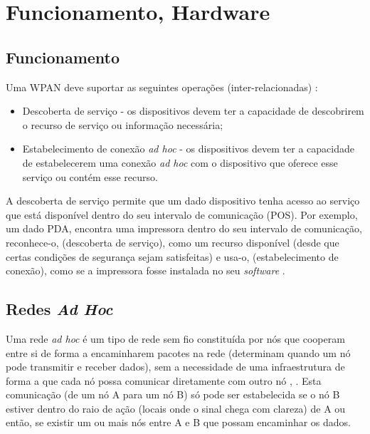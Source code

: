 \documentclass[conference]{IEEEtran}
\begin{document}
\section{Funcionamento, Hardware} \label{func_hard}

\subsection{Funcionamento}

Uma WPAN deve suportar as seguintes operações (inter-relacionadas) \cite{prasad2004ofdm}:

\begin{itemize}

 \item Descoberta de serviço - os dispositivos devem ter a capacidade de descobrirem o recurso de serviço ou informação necessária;
 \item Estabelecimento de conexão \textit{ad hoc} - os dispositivos devem ter a capacidade de estabelecerem uma conexão \textit{ad hoc} com o dispositivo que oferece esse serviço ou contém esse recurso.
 
\end{itemize}

A descoberta de serviço permite que um dado dispositivo tenha acesso ao serviço que está disponível dentro do seu intervalo de comunicação (POS).
Por exemplo, um dado PDA, encontra uma impressora dentro do seu intervalo de comunicação, reconhece-o, (descoberta de serviço), como um recurso disponível (desde que certas condições de segurança sejam satisfeitas) e usa-o, (estabelecimento de conexão), como se a impressora fosse instalada no seu \textit{software} \cite{prasad2004ofdm}.

\subsection{Redes \textit{Ad Hoc}} \label{redes_ad_hoc}

Uma rede \textit{ad hoc} é um tipo de rede sem fio constituída por nós que cooperam entre si de forma a encaminharem pacotes na rede (determinam quando um nó pode transmitir e receber dados), sem a necessidade de uma infraestrutura de forma a que cada nó possa comunicar diretamente com outro nó \cite{salonidis2005distributed}, \cite{rubinstein2002qualidade}. 
Esta comunicação (de um nó A para um nó B) só pode ser estabelecida se o nó B estiver dentro do raio de ação (locais onde o sinal chega com clareza) de A ou então, se existir um ou mais nós entre A e B que possam encaminhar os dados.
\end{document}
